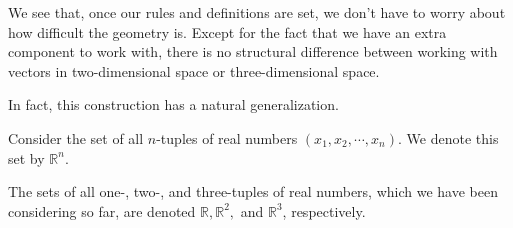 \documentclass[12pt,letterpaper,reqno]{article}
\numberwithin{equation}{section}
\begin{document}
We see that, once our rules and definitions are set, we don't have to worry about how difficult the geometry is. Except for the fact that we have an extra component to work with, there is no structural difference between working with vectors in two-dimensional space or three-dimensional space.

In fact, this construction has a natural generalization.

\begin{defn}
	Consider the set of all $n$-tuples of real numbers $(x_1,x_2,\cdots,x_n)$. We denote this set by $\mathbb{R}^n$.
\end{defn}

\begin{example}
	The sets of all one-, two-, and three-tuples of real numbers, which we have been considering so far, are denoted $\mathbb{R}, \mathbb{R}^2,$ and $\mathbb{R}^3$, respectively.
\end{example}
\end{document}
